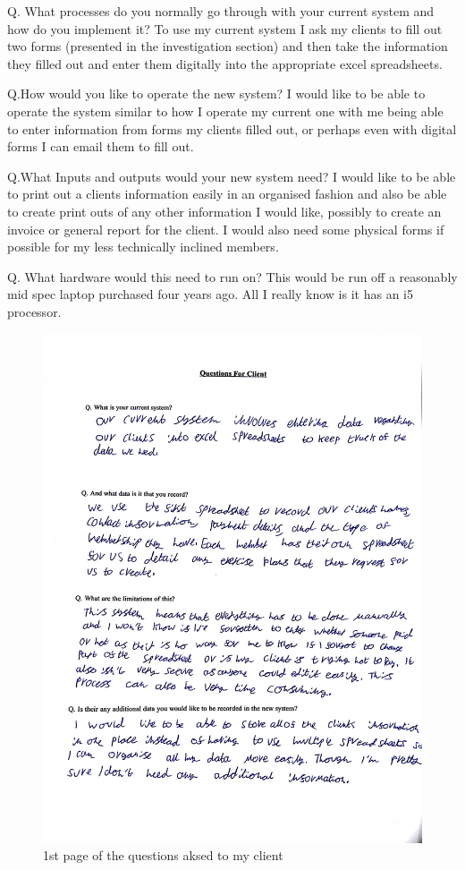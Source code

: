 Q. What processes do you normally go through with your current system and how do you implement it?
To use my current system I ask my clients to fill out two forms (presented in the investigation section) and then take the information they filled out and enter them digitally into the appropriate excel spreadsheets.

Q.How would you like to operate the new system?
I would like to be able to operate the system similar to how I operate my current one with me being able to enter information from forms my clients filled out, or perhaps even with digital forms I can email them to fill out.

Q.What Inputs and outputs would your new system need? 
I would like to be able to print out a clients information easily in an organised fashion and also be able to create print outs of any other information I would like, possibly to create an invoice or general report for the client. I would also need some physical forms if possible for my less technically inclined members.

Q. What hardware would this need to run on?
﻿This would be run off a reasonably mid spec laptop purchased four years ago. All I really know is it has an i5 processor.

\begin{figure}[H]
    \includegraphics[width=\textwidth]{questionaire 1.jpg}
    \caption{1st page of the questions aksed to my client} \label{fig:1st page of the questions aksed to my client}
\end{figure}
